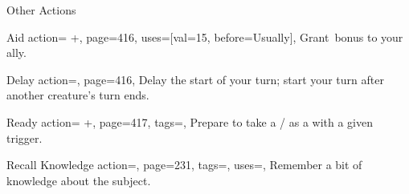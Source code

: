 \begin{PageBackLandscape}
\begin{TablesHalf}{\backTableHeight}
\begin{Table}{Other Actions}
\begin{entry}{Aid}{%
                action= +,
                page=416,
                uses={[val=15, before=Usually]},
            }
                Grant \,\Cirm bonus to your ally. \hfill
                \quad{}
            \end{entry}
            \begin{entry}{Delay}{%
                action=,
                page=416,
            }
                Delay the start of your turn; start your turn after another creature's turn ends.
            \end{entry}
            \begin{entry}{Ready}{%
                action= +,
                page=417,
                tags=\Concentrate,
            }
                Prepare to take a /\! as a  with a given trigger.
            \end{entry}
            \begin{entry}{Recall Knowledge}{%
                action=,
                page=231,
                tags=\Concentrate,
                uses={\VariousKnowledge[tags={S}]},
            }
                Remember a bit of knowledge about the subject.\hfill
                \quad
            \end{entry}
        \end{Table}
    \end{TablesHalf}%
\end{PageBackLandscape}




